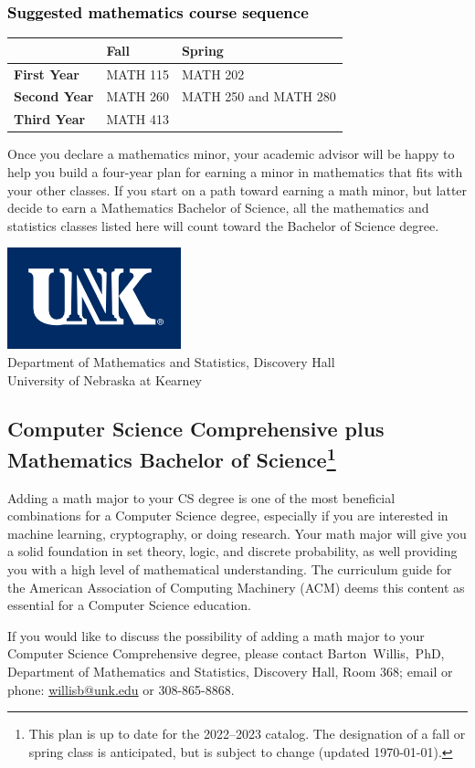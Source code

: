 \documentclass[10pt]{article}
\makeatletter
\newcommand{\calconeshort}{MATH 115}
\newcommand{\calctwoshort}{MATH 202}
\newcommand{\foundationsshort}{MATH 250}
\newcommand{\calcthreeshort}{MATH 260}
\newcommand{\linearshort}{MATH 280}
\newcommand{\discreteshort}{MATH 413}
\newcommand{\contactbw}{\mbox{Barton Willis, PhD}, Department of Mathematics and Statistics,  Discovery Hall, Room 368;
email or phone: \href{mailto:willisb@unk.edu}{willisb@unk.edu} or 308-865-8868.}
\newcommand{\forinfo}[2]{If you would like to discuss the possibility of adding a math {#1} to your {#2}, please contact \contactbw}
\newcommand{\catalog}{2022--2023 }
\newcommand{\myfootnote}{\footnote{This plan is up to date for  the \catalog catalog. The designation of a fall or spring class is 
anticipated, but  is subject to change (updated  \today).}}
\newcommand{\myheading}{
\begin{flushleft}
\includegraphics[scale=0.35]{unk-logo}\\
\setcounter{footnote}{0}
\vspace{0.25in}
 \textcolor{unkblue}{Department of Mathematics and Statistics, Discovery Hall} \\
  \textcolor{unkblue}{University of Nebraska at Kearney}
\end{flushleft}}
\makeatother
\begin{document}
\subsubsection*{\textcolor{black}{Suggested mathematics course sequence}}

\begin{tabular}[h]{| l | l | l|} 
\hline
           & \textbf{Fall}         &  \textbf{Spring}  \\ \hline 
\textbf{First Year} & \calconeshort & \calctwoshort \\  \hline
\textbf{Second Year} &  \calcthreeshort & \foundationsshort{}  and \linearshort \\ \hline
\textbf{Third Year} &    \discreteshort              &  \\ \hline
\end{tabular}

 \vspace{0.1in}
\noindent Once you declare a mathematics minor, your academic advisor will be happy to help you build a four-year plan for earning a minor in mathematics that fits with your other classes.  If you start on a path toward earning a math minor, but latter decide to earn a  Mathematics Bachelor of Science, all the mathematics and statistics  classes listed here will count toward the Bachelor of Science degree.



\newpage

\myheading



\vspace{-0.1in}
\subsection*{\textbf{\textcolor{unkblue}{Computer Science Comprehensive plus Mathematics Bachelor of Science\myfootnote}}}

Adding a math major to your CS degree is one of the most beneficial combinations for a Computer Science degree, especially if you are interested in machine learning, cryptography,   or doing research.  Your math major  will give you a solid foundation in set theory, logic, and discrete probability, as well providing you with a high level of mathematical understanding.  The curriculum guide for the American Association of Computing Machinery (ACM) deems  this content  as essential for  a Computer Science education.



\forinfo{major}{Computer Science Comprehensive degree}
\end{document}
